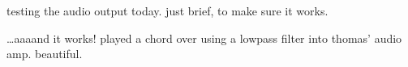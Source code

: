 testing the audio output today. just brief, to make sure it works.

\dots aaaand it works! played a chord over \pwm using a lowpass filter into
thomas' audio amp. beautiful.
